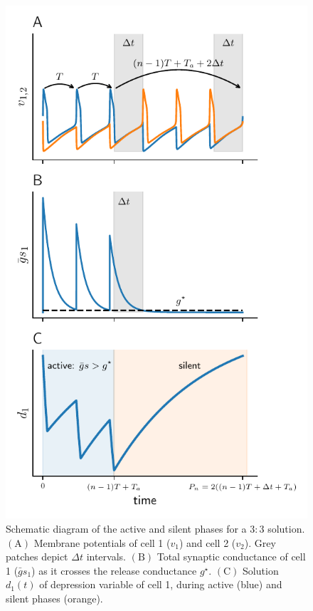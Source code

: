 \documentclass[utf8]{frontiersFPHY} %
\newcommand{\delt}{\Delta t}
\begin{document}
\begin{figure}[h!]
	\centering
	\includegraphics{free-quiet}
	\caption{Schematic diagram of the active and silent phases for a $3:3$ solution.
		$\bm{\mathrm{(A)}}$ Membrane potentials of cell 1 ($v_{1}$) and cell 2 ($v_{2}$).
		Grey patches depict $\delt$ intervals.
		$\bm{\mathrm{(B)}}$ Total synaptic conductance of cell 1 ($\bar g s_1$) as it crosses the release conductance $g^{\star}$.
		$\bm{\mathrm{(C)}}$ Solution $d_1(t)$ of depression variable of cell 1, during active (blue) and silent phases (orange).~\label{fig:free-quiet}}
\end{figure}
\end{document}
